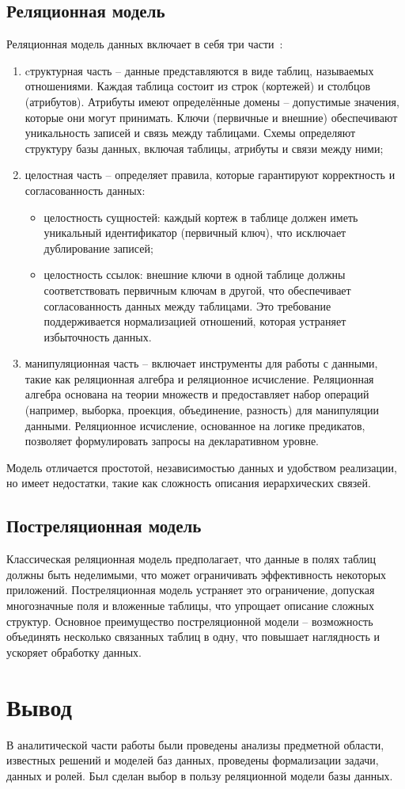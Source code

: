 \subsection{Реляционная модель}

Реляционная модель данных включает в себя три части~\cite{lit8}:
\begin{enumerate}
	\item cтруктурная часть -- данные представляются в виде таблиц, называемых отношениями. Каждая таблица состоит из строк (кортежей) и столбцов (атрибутов). Атрибуты имеют определённые домены -- допустимые значения, которые они могут принимать. Ключи (первичные и внешние) обеспечивают уникальность записей и связь между таблицами. Схемы определяют структуру базы данных, включая таблицы, атрибуты и связи между ними;
	\item целостная часть -- определяет правила, которые гарантируют корректность и согласованность данных:
	\begin{itemize}[label=--]
		\item целостность сущностей: каждый кортеж в таблице должен иметь уникальный идентификатор (первичный ключ), что исключает дублирование записей;
		\item целостность ссылок: внешние ключи в одной таблице должны соответствовать первичным ключам в другой, что обеспечивает согласованность данных между таблицами. Это требование поддерживается нормализацией отношений, которая устраняет избыточность данных.
	\end{itemize}
	\item манипуляционная часть -- включает инструменты для работы с данными, такие как реляционная алгебра и реляционное исчисление. Реляционная алгебра основана на теории множеств и предоставляет набор операций (например, выборка, проекция, объединение, разность) для манипуляции данными. Реляционное исчисление, основанное на логике предикатов, позволяет формулировать запросы на декларативном уровне.
\end{enumerate}

Модель отличается простотой, независимостью данных и удобством реализации, но имеет недостатки, такие как сложность описания иерархических связей.

\subsection{Постреляционная модель}

Классическая реляционная модель предполагает, что данные в полях таблиц должны быть неделимыми, что может ограничивать эффективность некоторых приложений. Постреляционная модель устраняет это ограничение, допуская многозначные поля и вложенные таблицы, что упрощает описание сложных структур. Основное преимущество постреляционной модели -- возможность объединять несколько связанных таблиц в одну, что повышает наглядность и ускоряет обработку данных.

\section{Вывод}

В аналитической части работы были проведены анализы предметной области, известных решений и моделей баз данных, проведены формализации задачи, данных и ролей. Был сделан выбор в пользу реляционной модели базы данных.

\clearpage
